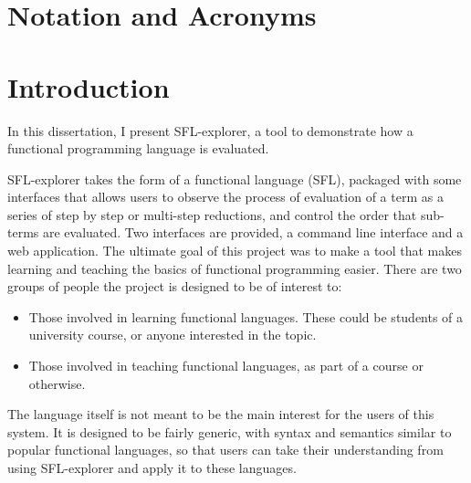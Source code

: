 \documentclass[
author=Kiran Sturt,
degree=BSc,
title=Implementing a Step by Step Evaluator for a Simple Functional Programming language,
unit=COMS30045,twoside]{dissertation}
\theoremstyle{definition}
\theoremstyle{break}
\theoremstyle{definition}
\begin{document}
\chapter*{Notation and Acronyms}


%

\mainmatter


\chapter{Introduction}
\label{chap:context}

In this dissertation, I present SFL-explorer, a tool to demonstrate how a functional programming language is evaluated.

SFL-explorer takes the form of a functional language (SFL), packaged with some interfaces that allows users to observe the process of evaluation of a term as a series of step by step or multi-step reductions, and control the order that sub-terms are evaluated. Two interfaces are provided, a command line interface and a web application. The ultimate goal of this project was to make a tool that makes learning and teaching the basics of functional programming easier. There are two groups of people the project is designed to be of interest to:
\begin{itemize}
    \item Those involved in learning functional languages. These could be students of a university course, or anyone interested in the topic.
    \item Those involved in teaching functional languages, as part of a course or otherwise.
\end{itemize}

The language itself is not meant to be the main interest for the users of this system. It is designed to be fairly generic, with syntax and semantics similar to popular functional languages, so that users can take their understanding from using SFL-explorer and apply it to these languages. 
\end{document}
